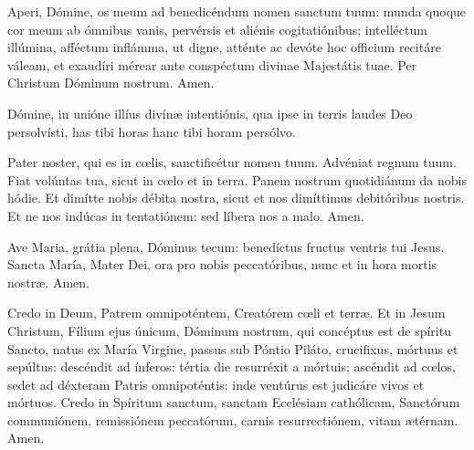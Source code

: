 \documentclass[nocturnale-romanum.tex]{subfiles}
\begin{document}

\begin{multicols}{2}
Aperi, Dómine, os meum ad benedicéndum nomen sanctum tuum: munda quoque cor meum ab ómnibus vanis, pervérsis et aliénis 
cogitatiónibus; intelléctum illúmina, afféctum inflámma, ut digne, atténte ac devóte hoc officium recitáre váleam, et exaudíri mérear
ante conspéctum divinae Majestátis tuae. Per Christum Dóminum nostrum. Amen.

Dómine, in unióne illíus divínæ intentiónis, qua ipse in terris laudes Deo persolvísti, has tibi horas  hanc tibi horam\rubric{)} persólvo.
\end{multicols}
\begin{multicols}{2}
Pater noster, qui es in cœlis, sanctificétur nomen tuum. Advéniat regnum tuum. Fiat volúntas tua, sicut in cœlo et in terra.
Panem nostrum quotidiánum da nobis hódie. Et dimítte nobis débita nostra, sicut et nos dimíttimus debitóribus nostris. Et ne nos
indúcas in tentatiónem: sed líbera nos a malo. Amen.

Ave Maria, grátia plena, Dóminus tecum: benedíctus fructus ventris tui Jesus. Sancta María, Mater Dei, ora pro nobis 
peccatóribus, nunc et in hora mortis nostræ. Amen.

Credo in Deum, Patrem omnipoténtem, Creatórem cœli et terræ. Et in Jesum Christum, Fílium ejus únicum, Dóminum nostrum,
qui concéptus est de spíritu Sancto, natus ex María Virgine, passus sub Póntio Piláto, crucifixus, mórtuus et sepúltus: descéndit
ad ínferos: tértia die resurréxit a mórtuis; ascéndit ad cœlos, sedet ad déxteram Patris omnipoténtis: inde ventúrus est judicáre
vivos et mórtuos. Credo in Spíritum sanctum, sanctam Ecclésiam cathólicam, Sanctórum communiónem, remissiónem peccatórum,
carnis resurrectiónem, vitam ætérnam. Amen.
\end{multicols}

\end{document}
